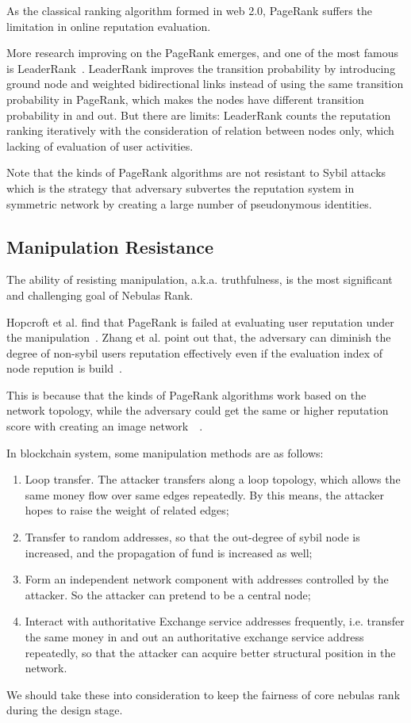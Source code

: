 As the classical ranking algorithm formed in web 2.0, PageRank suffers the limitation in online reputation evaluation.


More research improving on the PageRank emerges, and one of the most famous is LeaderRank~\cite{Li2014}. LeaderRank improves the transition probability by introducing ground node and weighted bidirectional links instead of using the same transition probability in PageRank, which makes the nodes have different transition probability in and out. But there are limits: LeaderRank counts the reputation ranking iteratively with the consideration of relation between nodes only, which lacking of evaluation of user activities. 


Note that the kinds of PageRank algorithms are not resistant to Sybil attacks~\cite{cheng2006manipulability} which is the strategy that adversary subvertes the reputation system in symmetric network by creating a large number of pseudonymous identities.


\subsection{Manipulation Resistance}
The ability of resisting manipulation, a.k.a. truthfulness, is the most significant and challenging goal of Nebulas Rank. 

Hopcroft et al. find that PageRank is failed at evaluating user reputation under the manipulation~\cite{hopcroft2007manipulation}. Zhang et al. point out that, the adversary can diminish the degree of non-sybil users reputation effectively even if the evaluation index of node repution is build~\cite{zhang2016truetop}.

This is because that the kinds of PageRank algorithms work based on the network topology, while the adversary could get the same or higher reputation score with creating an image network~\cite{cheng2005sybilproof}~\cite{cheng2006manipulability}.

In blockchain system, some manipulation methods are as follows:
\begin{enumerate}
\item Loop transfer. The attacker transfers along a loop topology, which allows the same money flow over same edges repeatedly. By this means, the attacker hopes to raise the weight of related edges;
\item Transfer to random addresses, so that the out-degree of sybil node is increased, and the propagation of fund is increased as well;
\item Form an independent network component with addresses controlled by the attacker. So the attacker can pretend to be a central node;
\item Interact with authoritative Exchange service addresses frequently, i.e. transfer the same money in and out an authoritative exchange service address repeatedly, so that the attacker can acquire better structural position in the network.
\end{enumerate}

We should take these into consideration to keep the fairness of core nebulas rank during the design stage.

